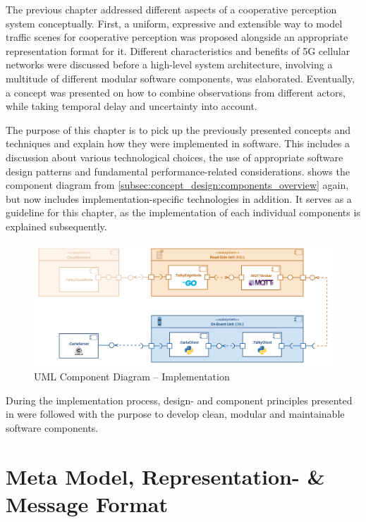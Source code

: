 The previous chapter addressed different aspects of a cooperative perception system conceptually. First, a uniform, expressive and extensible way to model traffic scenes for cooperative perception was proposed alongside an appropriate representation format for it. Different characteristics and benefits of 5G cellular networks were discussed before a high-level system architecture, involving a multitude of different modular software components, was elaborated. Eventually, a concept was presented on how to combine observations from different actors, while taking temporal delay and uncertainty into account. 
\par
\bigskip

The purpose of this chapter is to pick up the previously presented concepts and techniques and explain how they were implemented in software. This includes a discussion about various technological choices, the use of appropriate software design patterns and fundamental performance-related considerations.  shows the component diagram from \cref{subsec:concept_design:components_overview} again, but now includes implementation-specific technologies in addition. It serves as a guideline for this chapter, as the implementation of each individual components is explained subsequently. 

\begin{figure}[h]
	\centering
	\includegraphics[width=1\linewidth]{98_images/components_full}
	\caption{UML Component Diagram – Implementation}
	\label{fig:components_full}
\end{figure}
\par
\bigskip

During the implementation process, design- and component principles presented in \cite{Martin2017} were followed with the purpose to develop clean, modular and maintainable software components.

\section{Meta Model, Representation- \& Message Format}
\label{sec:implementation:meta_model_representation_message_format}

